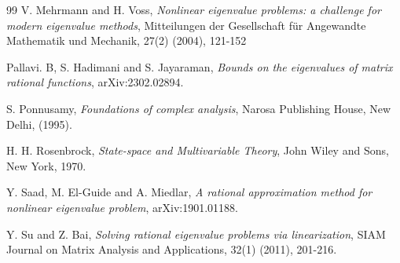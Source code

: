 \documentclass[12pt, reqno]{amsart}
\theoremstyle{definition}
\theoremstyle{remark}
\numberwithin{equation}{section}
\begin{document}
\begin{thebibliography}{99}
V. Mehrmann and H. Voss, \emph{Nonlinear eigenvalue problems: a challenge for modern 
eigenvalue methods}, Mitteilungen der Gesellschaft f\"{u}r Angewandte Mathematik und 
Mechanik, 27(2) (2004), 121-152

Pallavi. B, S. Hadimani and S. Jayaraman, \emph{Bounds on the eigenvalues of matrix 
rational functions}, arXiv:2302.02894.

S. Ponnusamy, \emph{Foundations of complex analysis}, Narosa Publishing House, New Delhi, 
(1995).

H. H. Rosenbrock, \emph{State-space and Multivariable Theory}, John Wiley and Sons, 
New York, 1970.
 	  	
Y. Saad, M. El-Guide and A. Miedlar, \emph{A rational approximation method for nonlinear 
eigenvalue problem}, arXiv:1901.01188.

Y. Su and Z. Bai, \emph{Solving rational eigenvalue problems via linearization}, SIAM Journal 
on Matrix Analysis and Applications, 32(1) (2011), 201-216.	
\end{thebibliography}

\end{document}
